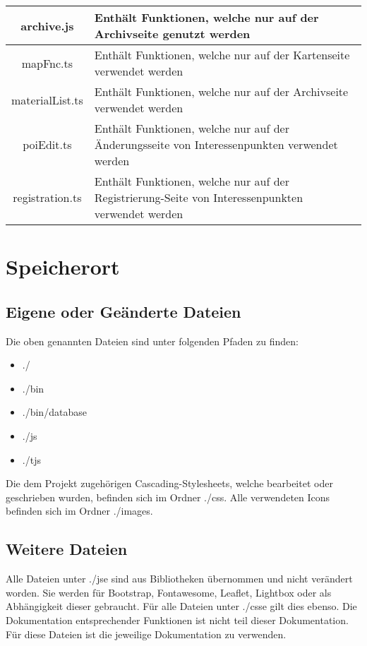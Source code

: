 \begin{longtable}[H]{|c|p{10cm}|}
	archive.js & Enthält  Funktionen, welche nur auf der Archivseite genutzt werden\\ \hline
	mapFnc.ts & Enthält Funktionen, welche nur auf der Kartenseite verwendet werden \\ \hline
	materialList.ts & Enthält Funktionen, welche nur auf der Archivseite verwendet werden \\ \hline
	poiEdit.ts & Enthält Funktionen, welche nur auf der Änderungsseite von Interessenpunkten verwendet werden \\ \hline
	registration.ts & Enthält Funktionen, welche nur auf der Registrierung-Seite von Interessenpunkten verwendet werden \\ \hline
\end{longtable}
\section{Speicherort}
\subsection{Eigene oder Geänderte Dateien}
Die oben genannten Dateien sind unter folgenden Pfaden zu finden:
\begin{itemize}
	\item {\glqq ./\grqq}
	\item {\glqq ./bin\grqq}
	\item {\glqq ./bin/database\grqq}
	\item {\glqq ./js\grqq}
	\item {\glqq ./tjs\grqq}
\end{itemize}
Die dem Projekt zugehörigen Cascading-Stylesheets, welche bearbeitet oder geschrieben wurden, befinden sich im Ordner {\glqq ./css\grqq}. Alle verwendeten Icons befinden sich im Ordner {\glqq ./images\grqq}.
\subsection{Weitere Dateien}
Alle Dateien unter {\glqq ./jse\grqq} sind aus Bibliotheken übernommen und nicht verändert worden. Sie werden für Bootstrap, Fontawesome, Leaflet, Lightbox oder als Abhängigkeit dieser gebraucht. Für alle Dateien unter {\glqq ./csse\grqq} gilt dies ebenso. Die Dokumentation entsprechender Funktionen ist nicht teil dieser Dokumentation. Für diese Dateien ist die jeweilige Dokumentation zu verwenden. 
